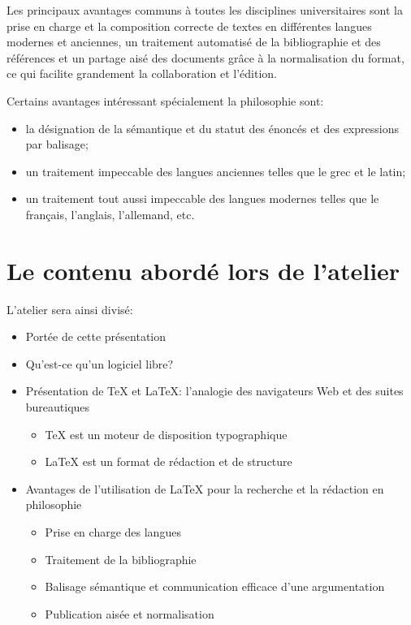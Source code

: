\documentclass{article}
\begin{document}
Les principaux avantages communs à toutes les disciplines universitaires sont la prise en charge et la composition correcte de textes en différentes langues modernes et anciennes, un traitement automatisé de la bibliographie et des références et un partage aisé des documents grâce à la normalisation du format, ce qui facilite grandement la collaboration et l’édition.

Certains avantages intéressant spécialement la philosophie sont:

\smallskip{}

\begin{itemize}
\item la désignation de la sémantique et du statut des énoncés et des expressions par balisage;
\item un traitement impeccable des langues anciennes telles que le grec et le latin;
\item un traitement tout aussi impeccable des langues modernes telles que le français, l’anglais, l’allemand, etc.
\end{itemize}

\section{Le contenu abordé lors de l’atelier}

L’atelier sera ainsi divisé:

\smallskip{}

\begin{itemize}
\item{Portée de cette présentation}
\item{Qu’est-ce qu’un logiciel libre?}
\item{Présentation de \TeX{} et \LaTeX{}: l’analogie des navigateurs Web et des suites bureautiques}
\begin{itemize}
\item{\TeX{} est un moteur de disposition typographique}
\item{\LaTeX{} est un format de rédaction et de structure}
\end{itemize}
\item{Avantages de l’utilisation de \LaTeX{} pour la recherche et la rédaction en philosophie}
\begin{itemize}
\item{Prise en charge des langues}
\item{Traitement de la bibliographie}
\item{Balisage sémantique et communication efficace d’une argumentation}
\item{Publication aisée et normalisation}
\end{itemize}
\end{itemize}
\end{document}
